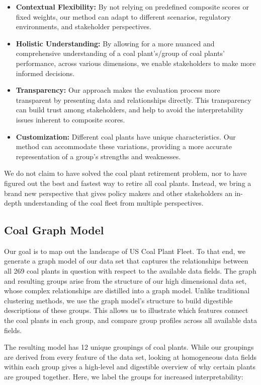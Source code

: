 \documentclass{article}
\begin{document}
\begin{itemize}
    \item \textbf{Contextual Flexibility:} By not relying on predefined composite scores or fixed weights, our method can adapt to different scenarios, regulatory environments, and stakeholder perspectives.
    \item \textbf{Holistic Understanding:} By allowing for a more nuanced and comprehensive understanding of a coal plant's/group of coal plants' performance, across various dimensions, we enable stakeholders to make more informed decisions.
    \item \textbf{Transparency:} Our approach makes the evaluation process more transparent by presenting data and relationships directly. This transparency can build trust among stakeholders, and help to avoid the interpretability issues inherent to composite scores.
    \item \textbf{Customization:} Different coal plants have unique characteristics. Our method can accommodate these variations, providing a more accurate representation of a group's strengths and weaknesses.
\end{itemize}

We do not claim to have solved the coal plant retirement problem, nor to have figured out the best and fastest way to retire all coal plants. Instead, we bring a brand new perspective that gives policy makers and other stakeholders an in-depth understanding of the coal fleet from multiple perspectives.

\subsection{Coal Graph Model}
Our goal is to map out the landscape of US Coal Plant Fleet. To that end, we generate a graph model of our data set that captures the relationships between all 269 coal plants in question with respect to the available data fields. The graph and resulting groups arise from the structure of our high dimensional data set, whose complex relationships are distilled into a graph model. Unlike traditional clustering methods, we use the graph model’s structure to build digestible descriptions of these groups. This allows us to illustrate which features connect the coal plants in each group, and compare group profiles across all available data fields.

The resulting model has 12 unique groupings of coal plants. While our groupings are derived from every feature of the data set, looking at homogeneous data fields within each group gives a high-level and digestible overview of why certain plants are grouped together. Here, we label the groups for increased interpretability:
\end{document}

